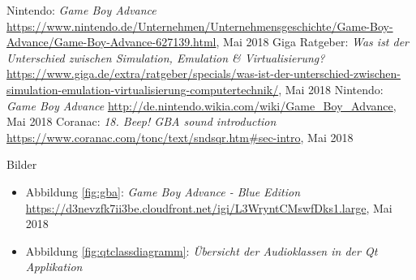 \documentclass[11pt,a4paper]{scrartcl}
\begin{document}
\begin{thebibliography}{tiefe}
    Nintendo: \textit{Game Boy Advance}\newline
    \url{https://www.nintendo.de/Unternehmen/Unternehmensgeschichte/Game-Boy-Advance/Game-Boy-Advance-627139.html}, Mai 2018
    Giga Ratgeber: \textit{Was ist der Unterschied zwischen Simulation, Emulation \& Virtualisierung?}\newline
    \url{https://www.giga.de/extra/ratgeber/specials/was-ist-der-unterschied-zwischen-simulation-emulation-virtualisierung-computertechnik/}, Mai 2018
    Nintendo: \textit{Game Boy Advance}\newline
    \url{http://de.nintendo.wikia.com/wiki/Game_Boy_Advance}, Mai 2018
    Coranac: \textit{18. Beep! GBA sound introduction}\newline
    \url{https://www.coranac.com/tonc/text/sndsqr.htm#sec-intro}, Mai 2018
\end{thebibliography}

\vspace{1cm}

\huge Bilder
\normalsize

\begin{itemize}
    \item Abbildung \ref{fig:gba}: \textit{Game Boy Advance - Blue Edition}\newline
    \url{https://d3nevzfk7ii3be.cloudfront.net/igi/L3WryntCMswfDks1.large}, Mai 2018
\end{itemize}

\begin{itemize}
    \item Abbildung \ref{fig:qtclassdiagramm}: \textit{\"Ubersicht der Audioklassen in der Qt Applikation}
\end{itemize}
\end{document}

